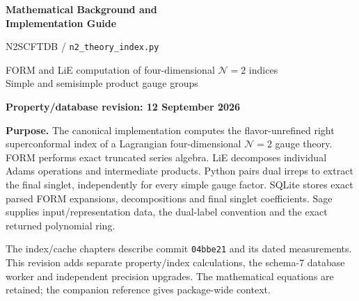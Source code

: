 \documentclass[11pt,a4paper]{article}
\newcommand{\code}[1]{{\small\nolinkurl{#1}}}
\begin{document}
\begin{center}
{\Large\sffamily\bfseries Mathematical Background and\\ Implementation Guide}\par
{\large N2SCFTDB / \texttt{n2\_theory\_index.py}}\par
FORM and LiE computation of four-dimensional $\mathcal N=2$ indices\\
Simple and semisimple product gauge groups\par
\textbf{Property/database revision: 12 September 2026}
\end{center}
\vspace{3mm}
\textbf{Purpose.} The canonical implementation computes the flavor-unrefined right
superconformal index of a Lagrangian four-dimensional $\mathcal N=2$ gauge theory.
FORM performs exact truncated series algebra. LiE decomposes individual Adams
operations and intermediate products. Python pairs dual irreps to extract the
final singlet, independently for every simple gauge factor. SQLite stores exact
parsed FORM expansions, decompositions and final singlet coefficients. Sage supplies input/representation
data, the dual-label convention and the exact returned polynomial ring.

The index/cache chapters describe commit \code{04bbe21} and its dated
measurements. This revision adds separate property/index calculations, the
schema-7 database worker and independent precision upgrades. The mathematical
equations are retained; the companion reference gives package-wide context.
\end{document}
